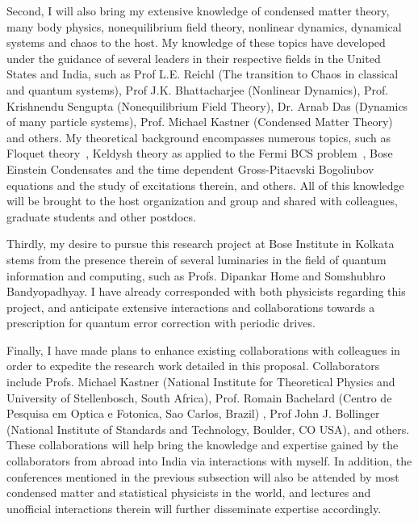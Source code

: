 \documentclass[a4paper,11pt,color]{article}
\begin{document}
Second, I will also bring my extensive knowledge of condensed matter theory, many body physics, nonequilibrium field theory, nonlinear dynamics, dynamical systems and chaos to the host. My knowledge of these topics have developed under the guidance of several leaders in their respective fields in the United States and India, such as Prof L.E. Reichl (The transition to Chaos in classical and quantum systems), Prof J.K. Bhattacharjee (Nonlinear Dynamics), Prof. Krishnendu Sengupta (Nonequilibrium Field Theory), Dr. Arnab Das (Dynamics of many particle systems), Prof. Michael Kastner (Condensed Matter Theory) and others. My theoretical background encompasses numerous topics, such as  Floquet theory~\cite{floquet}, Keldysh theory as applied to the Fermi BCS problem~\cite{bcs}, Bose Einstein Condensates and the time dependent Gross-Pitaevski Bogoliubov equations and the study of excitations therein, and others. All of this knowledge will be brought to the host organization and group and shared with colleagues, graduate students and other postdocs.

Thirdly, my desire to pursue this research project at Bose Institute in Kolkata stems from the presence therein of several luminaries in the field of quantum information and computing, such as Profs. Dipankar Home and Somshubhro Bandyopadhyay. I have already corresponded with both physicists regarding this project, and anticipate extensive interactions and collaborations towards a prescription for quantum error correction with periodic drives.

Finally, I have made plans to enhance existing collaborations with colleagues in order to expedite the research work detailed in this proposal. Collaborators include  Profs. Michael Kastner  (National Institute for Theoretical Physics and University of Stellenbosch, South Africa), Prof. Romain Bachelard (Centro de Pesquisa em Optica e Fotonica, Sao Carlos, Brazil)  , Prof  John J. Bollinger (National Institute of Standards and Technology, Boulder, CO USA), and others. These collaborations will help bring the knowledge and expertise gained by the collaborators from abroad into India via interactions with myself. In addition, the conferences  mentioned in the previous subsection will also be attended by most condensed matter and statistical physicists in the world, and lectures and unofficial interactions therein will further disseminate expertise accordingly.
\end{document}
